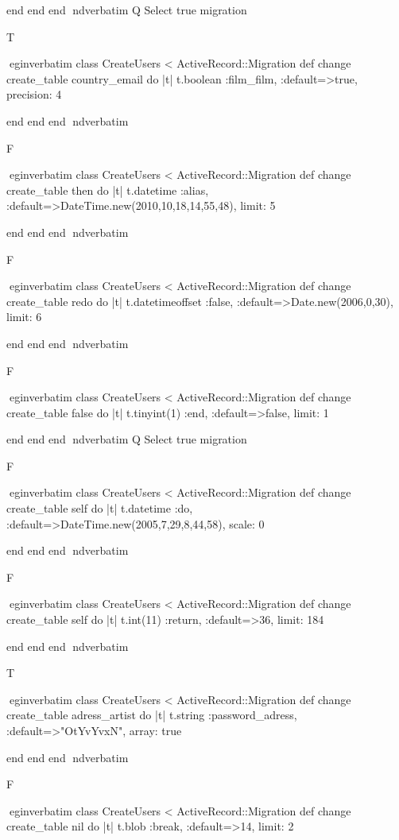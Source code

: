     end 
  end 
end
nd{verbatim}
Q
 Select true migration

T

egin{verbatim}
 class CreateUsers < ActiveRecord::Migration 
  def change 
    create_table country_email do |t| 
      t.boolean :film_film, :default=>true, precision: 4
    
    end 
  end 
end
nd{verbatim}

F

egin{verbatim}
 class CreateUsers < ActiveRecord::Migration 
  def change 
    create_table then do |t| 
      t.datetime :alias, :default=>DateTime.new(2010,10,18,14,55,48), limit: 5
    
    end 
  end 
end
nd{verbatim}

F

egin{verbatim}
 class CreateUsers < ActiveRecord::Migration 
  def change 
    create_table redo do |t| 
      t.datetimeoffset :false, :default=>Date.new(2006,0,30), limit: 6
    
    end 
  end 
end
nd{verbatim}

F

egin{verbatim}
 class CreateUsers < ActiveRecord::Migration 
  def change 
    create_table false do |t| 
      t.tinyint(1) :end, :default=>false, limit: 1
    
    end 
  end 
end
nd{verbatim}
Q
 Select true migration

F

egin{verbatim}
 class CreateUsers < ActiveRecord::Migration 
  def change 
    create_table self do |t| 
      t.datetime :do, :default=>DateTime.new(2005,7,29,8,44,58), scale: 0
    
    end 
  end 
end
nd{verbatim}

F

egin{verbatim}
 class CreateUsers < ActiveRecord::Migration 
  def change 
    create_table self do |t| 
      t.int(11) :return, :default=>36, limit: 184
    
    end 
  end 
end
nd{verbatim}

T

egin{verbatim}
 class CreateUsers < ActiveRecord::Migration 
  def change 
    create_table adress_artist do |t| 
      t.string :password_adress, :default=>"OtYvYvxN", array: true
    
    end 
  end 
end
nd{verbatim}

F

egin{verbatim}
 class CreateUsers < ActiveRecord::Migration 
  def change 
    create_table nil do |t| 
      t.blob :break, :default=>14, limit: 2
    
